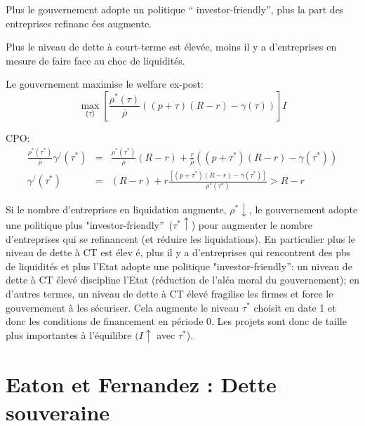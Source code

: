 \documentclass[a4paper]{article}
\begin{document}
Plus le gouvernement adopte un politique \textquotedblleft
investor-friendly\textquotedblright , plus la part des entreprises refinanc%
\'{e}es augmente.

Plus le niveau de dette \`{a} court-terme est \'{e}lev\'{e}e, moins il y a
d'entreprises en mesure de faire face au choc de liquidit\'{e}s.

Le gouvernement maximise le welfare ex-post:%
\begin{equation*}
\max_{\{\tau \}}\left[ \frac{\rho ^{\ast }(\tau )}{\overline{\rho }}\left(
(p+\tau )\left( R-r\right) -\gamma (\tau )\right) \right] I
\end{equation*}

CPO:%
\begin{eqnarray*}
\frac{\rho ^{\ast }(\tau ^{\ast })}{\overline{\rho }}\gamma ^{/}(\tau ^{\ast
}) &=&\frac{\rho ^{\ast }(\tau ^{\ast })}{\overline{\rho }}\left( R-r\right)
+\frac{r}{\overline{\rho }}\left( (p+\tau ^{\ast })\left( R-r\right) -\gamma
(\tau ^{\ast })\right) \\
\gamma ^{/}(\tau ^{\ast }) &=&\left( R-r\right) +r\frac{\left[ (p+\tau
^{\ast })\left( R-r\right) -\gamma (\tau ^{\ast })\right] }{\rho ^{\ast
}(\tau ^{\ast })}>R-r
\end{eqnarray*}

Si le nombre d'entreprises en liquidation augmente, $\rho ^{\ast }\downarrow 
$, le gouvernement adopte une politique plus
"investor-friendly\textquotedblright\ ($\tau ^{\ast }\uparrow $) pour
augmenter le nombre d'entreprises qui se refinancent (et r\'{e}duire les
liquidations). En particulier plus le niveau de dette \`{a} CT est \'{e}lev%
\'{e}, plus il y a d'entreprises qui rencontrent des pbs de liquidit\'{e}s
et plus l'Etat adopte une politique "investor-friendly\textquotedblright :
un niveau de dette \`{a} CT \'{e}lev\'{e} discipline l'Etat (r\'{e}duction
de l'al\'{e}a moral du gouvernement); en d'autres termes, un niveau de dette 
\`{a} CT \'{e}lev\'{e} fragilise les firmes et force le gouvernement \`{a}
les s\'{e}curiser. Cela augmente le niveau $\tau ^{\ast }$ choisit en date 1
et donc les conditions de financement en p\'{e}riode $0$. Les projets sont
donc de taille plus importantes \`{a} l'\'{e}quilibre $(I\uparrow $ avec $%
\tau ^{\ast }$).

\bigskip

\section{Eaton et Fernandez : Dette souveraine}
\end{document}
